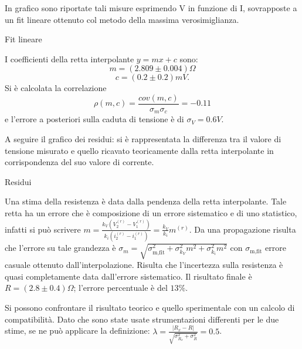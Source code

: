 In grafico sono riportate tali misure esprimendo V in funzione di I, sovrapposte a un fit lineare ottenuto col metodo della massima verosimiglianza.

\begin{grafico}
\centering

\caption{Fit lineare}
\label{fig:fitlin}
\end{grafico}

I coefficienti della retta interpolante $y=mx+c$ sono:
\[m = (2.809 \pm 0.004) \Omega \] 
\[c = (0.2 \pm 0.2) mV.\]
Si \`e calcolata la correlazione 
\[\rho(m, c) = \frac{cov(m, c)}{\sigma_m \sigma_c}=-0.11\]
e l'errore a posteriori sulla caduta di tensione \`e di $\sigma_V=0.6V$.

A seguire il grafico dei residui: si \`e rappresentata la differenza tra il valore di tensione misurato e quello ricavato teoricamente dalla retta interpolante in corrispondenza del suo valore di corrente.

\begin{grafico}
\centering

\caption{Residui}
\label{fig:residui}
\end{grafico}

Una stima della resistenza \`e data dalla pendenza della retta interpolante. Tale retta ha un errore che \`e composizione di un errore sistematico e di uno statistico, infatti si pu\`o scrivere $m=\frac{k_V (V_2^{(r)}-V_1^{(r)})}{k_i (i_2^{(r)} - i_1^{(r)})}=\frac{k_V}{k_i}m^{(r)}$.
Da una propagazione risulta che l'errore su tale grandezza \`e $\sigma_m=\sqrt{\sigma_{\textrm{m,fit}}^2 + \sigma_{k_V}^2 m^2 + \sigma_{k_i}^2 m^2}$ con $\sigma_{\textrm{m,fit}}$ errore casuale ottenuto dall'interpolazione.
Risulta che l'incertezza sulla resistenza \`e quasi completamente data dall'errore sistematico. Il risultato finale \`e $R=(2.8 \pm 0.4) \Omega$; l'errore percentuale \`e del $13 \%$.

Si possono confrontare il risultato teorico e quello sperimentale con un calcolo di compatibilit\`a. Dato che sono state usate strumentazioni differenti per le due stime, se ne pu\`o applicare la definizione: 
$\lambda=\frac{|R_x - R|}{\sqrt{\sigma_{R_x}^2+\sigma_R^2}}=0.5$.
 











